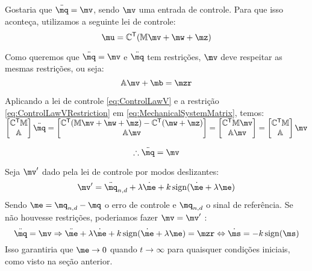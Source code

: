 Gostaria que $ \ddot{\mq} = \mv $, sendo $\mv$ uma entrada de controle. Para que isso aconte\c{c}a, utilizamos a seguinte lei de controle:
\begin{equation} \label{eq:ControlLawV}
\mu = \mC^\msT ( \mM \mv + \mw + \mz )
\end{equation}

Como queremos que $ \ddot{\mq} = \mv $ e $\ddot{\mq}$ tem restri\c{c}\~oes, $\mv$ deve respeitar as mesmas restri\c{c}\~oes, ou seja:
\begin{equation} \label{eq:ControlLawVRestriction}
\mA \mv + \mb = \mzr
\end{equation}

Aplicando a lei de controle \eqref{eq:ControlLawV} e a restri\c{c}\~ao \eqref{eq:ControlLawVRestriction} em \eqref{eq:MechanicalSystemMatrix}, temos: \\

$ \begin{bmatrix}
\mC^\msT \mM \\
\mA
\end{bmatrix}
\ddot{\mq}
=
\begin{bmatrix}
\mC^\msT ( \mM \mv + \mw + \mz ) - \mC^\msT(\mw + \mz) \\
\mA \mv
\end{bmatrix}
=
\begin{bmatrix}
\mC^\msT  \mM \mv \\
\mA \mv
\end{bmatrix}
=
\begin{bmatrix}
\mC^\msT \mM \\
\mA
\end{bmatrix}
\mv $

\begin{equation} \label{eq:ClosedLoopV}
\therefore \ddot{\mq} = \mv
\end{equation}

Seja $\mv'$ dado pela lei de controle por modos deslizantes:
\begin{equation} \label{eq:SMControlowLasV1'}
\mv' = \ddot{\mq}_{n, d} + \lambda \dot{\me} + k \sign (\dot{\me} + \lambda \me)
\end{equation}
Sendo $ \me = \mq_{n,d} - \mq $ o erro de controle e $\mq_{n,d}$ o sinal de refer\^encia. Se n\~ao houvesse restri\c{c}\~oes, poderiamos fazer $ \mv = \mv' $ :
$$ \ddot{\mq} = \mv \Rightarrow  \ddot{\me} + \lambda \dot{\me} + k \sign (\dot{\me} + \lambda \me) = \mzr \Leftrightarrow \dot{\ms} = - k \sign(\ms)$$
Isso garantiria que $\me \rightarrow 0$ quando $t \rightarrow \infty$ para quaisquer condi\c{c}\~oes iniciais, como visto na se\c{c}\~ao anterior. \\

